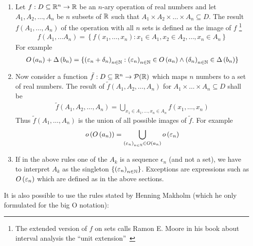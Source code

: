 \begin{enumerate}
  \item Let $f:D\subseteq\mathbb R^n\to\mathbb R$ be an $n$-ary operation of real numbers and let $A_1,A_2,\ldots,A_n$ be $n$ subsets of $\mathbb R$ such that $A_1\times A_2\times \dots\times A_n\subseteq D$. The result  $f\left(A_1,\ldots,A_n\right)$ of the operation with all $n$ sets is defined as the image of $f$ \footnote{The extended version of $f$ on sets calls Ramon E. Moore in his book about interval analysis the ``unit extension''~\cite[p. 18]{moore}}
\begin{align}
  f\left(A_1,\ldots A_n\right)=\left\{f(x_1,\ldots,x_n):x_1\in A_1,x_2\in A_2,\ldots,x_n\in A_n\right\}
\end{align}
  For example
  \begin{align}
    O\left( {a_n} \right) + \Delta\left( {b_n} \right) = \{ \left({\varepsilon_n+\delta_n}\right)_{{n}\in\mathbb N} : \left({\varepsilon_n}\right)_{{n}\in\mathbb N}\in O\left( {a_n} \right) \land \left({\delta_n}\right)_{{n}\in\mathbb N}\in\Delta\left( {b_n} \right)\}
  \end{align}

  \item Now consider a function $\tilde f:D\subseteq\mathbb R^n\to \mathcal P(\mathbb R)$ which maps $n$ numbers to a set of real numbers. The result of $\tilde f\left(A_1,A_2,\ldots,A_n\right)$ for $A_1\times\dots\times A_n\subseteq D$ shall be
\begin{align}
  \tilde f\left(A_1,A_2,\ldots,A_n\right) = \bigcup_{x_1\in A_1, \ldots, x_n \in A_n} f(x_1,\ldots,x_n)
\end{align}
Thus $\tilde f(A_1,\ldots,A_n)$ is the union of all possible images of $\tilde f$. For example
\begin{align}
  o\left( {O\left( {a_n} \right)} \right) = \bigcup_{\left({\varepsilon_n}\right)_{{n}\in\mathbb N}\in O\left( {a_n} \right)} o\left( {\varepsilon_n} \right)
\end{align}

  \item If in the above rules one of the $A_k$ is a sequence $\epsilon_n$ (and not a set), we have to interpret $A_k$ as the singleton $\{\left({\varepsilon_n}\right)_{{n}\in\mathbb N}\}$. Exceptions are expressions such as $O\left( {\varepsilon_n} \right)$ which are defined as in the above sections.
\end{enumerate}

It is also possible to use the rules stated by Henning Makholm\cite{bigo_rules2} (which he only formulated for the big O notation):

